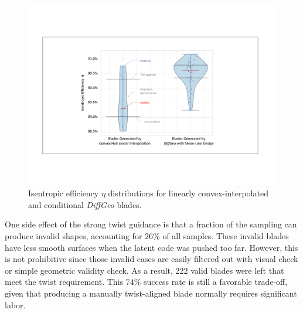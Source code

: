 \begin{figure}[!htb]
    \begin{center}
        \includegraphics[width=1\linewidth]{chapter6/fig/fig_isentropic_efficiency.pdf}
    \end{center}
    \caption{
        \small Isentropic efficiency $\eta$ distributions for linearly convex-interpolated and conditional \textit{DiffGeo} blades.
    }
    \label{ch6:fig:isentropic_efficiency}
\end{figure}

One side effect of the strong twist guidance is that a fraction of the sampling can produce invalid shapes, accounting for $26\%$ of all samples. These invalid blades have less smooth surfaces when the latent code was pushed too far. However, this is not prohibitive since those invalid cases are easily filtered out with visual check or simple geometric validity check. As a result, 222 valid blades were left that meet the twist requirement. This $74\%$ success rate is still a favorable trade-off, given that producing a manually twist-aligned blade normally requires significant labor.

